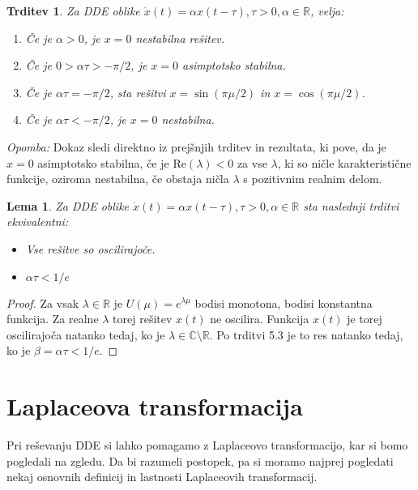 \documentclass[12pt,a4paper]{amsart}
\theoremstyle{definition} %
\theoremstyle{plain} %
\newtheorem{lema}[definicija]{Lema}
\newtheorem{trditev}[definicija]{Trditev}
\newcommand{\R}{\mathbb R}
\begin{document}
\begin{trditev}
    Za DDE oblike $\dot{x}(t)= \alpha x(t-\tau), \tau >0, \alpha \in \R$, velja:
    \begin{enumerate}
        \item Če je $\alpha > 0$, je $x=0$ nestabilna rešitev.
        \item Če je $0>\alpha \tau >-\pi/2$, je $x=0$ asimptotsko stabilna.
        \item Če je $\alpha \tau = -\pi/2$, sta rešitvi $x=\sin(\pi\mu/2)$ in $x=\cos(\pi\mu/2)$.
        \item Če je $\alpha\tau < -\pi/2$, je $x=0$ nestabilna.
    \end{enumerate}
\end{trditev}

\noindent \textit{Opomba: }Dokaz sledi direktno iz prejšnjih trditev in rezultata, ki pove, da je $x=0$ asimptotsko stabilna, če 
je $\text{Re}(\lambda) < 0$ za vse $\lambda$, ki so ničle karakteristične funkcije, oziroma nestabilna,
če obstaja ničla $\lambda$ s pozitivnim realnim delom.

\begin{lema}
    Za DDE oblike $\dot{x}(t)= \alpha x(t-\tau), \tau >0, \alpha \in \R$ sta naslednji trditvi
    ekvivalentni:
    \begin{itemize}
        \item Vse rešitve so oscilirajoče.
        \item $\alpha\tau < 1/e$
    \end{itemize}
\end{lema}

\begin{proof}
    Za vsak $\lambda \in \R$ je $U(\mu)=e^{\lambda\mu}$ bodisi monotona, bodisi konstantna funkcija.
    Za realne $\lambda$ torej rešitev $x(t)$ ne oscilira. Funkcija $x(t)$ je torej oscilirajoča natanko tedaj, ko
    je $\lambda\in\mathbb{C}\setminus\mathbb{R}$. Po trditvi 5.3 je to res natanko tedaj, ko je 
    $\beta = \alpha\tau < 1/e$.
\end{proof}

\section{Laplaceova transformacija}

Pri reševanju DDE si lahko pomagamo z Laplaceovo transformacijo, kar si bomo pogledali na zgledu.
Da bi razumeli postopek, pa si moramo najprej pogledati nekaj osnovnih definicij in lastnosti
Laplaceovih transformacij.
\end{document}
